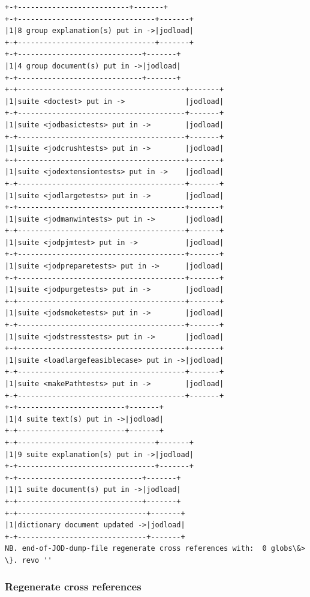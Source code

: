 \documentclass[11pt,letter,landscape]{article}
\begin{document}
\begin{Verbatim}[commandchars=\\\{\}]
+-+--------------------------+-------+
+-+--------------------------------+-------+
|1|8 group explanation(s) put in ->|jodload|
+-+--------------------------------+-------+
+-+-----------------------------+-------+
|1|4 group document(s) put in ->|jodload|
+-+-----------------------------+-------+
+-+---------------------------------------+-------+
|1|suite <doctest> put in ->              |jodload|
+-+---------------------------------------+-------+
|1|suite <jodbasictests> put in ->        |jodload|
+-+---------------------------------------+-------+
|1|suite <jodcrushtests> put in ->        |jodload|
+-+---------------------------------------+-------+
|1|suite <jodextensiontests> put in ->    |jodload|
+-+---------------------------------------+-------+
|1|suite <jodlargetests> put in ->        |jodload|
+-+---------------------------------------+-------+
|1|suite <jodmanwintests> put in ->       |jodload|
+-+---------------------------------------+-------+
|1|suite <jodpjmtest> put in ->           |jodload|
+-+---------------------------------------+-------+
|1|suite <jodpreparetests> put in ->      |jodload|
+-+---------------------------------------+-------+
|1|suite <jodpurgetests> put in ->        |jodload|
+-+---------------------------------------+-------+
|1|suite <jodsmoketests> put in ->        |jodload|
+-+---------------------------------------+-------+
|1|suite <jodstresstests> put in ->       |jodload|
+-+---------------------------------------+-------+
|1|suite <loadlargefeasiblecase> put in ->|jodload|
+-+---------------------------------------+-------+
|1|suite <makePathtests> put in ->        |jodload|
+-+---------------------------------------+-------+
+-+-------------------------+-------+
|1|4 suite text(s) put in ->|jodload|
+-+-------------------------+-------+
+-+--------------------------------+-------+
|1|9 suite explanation(s) put in ->|jodload|
+-+--------------------------------+-------+
+-+-----------------------------+-------+
|1|1 suite document(s) put in ->|jodload|
+-+-----------------------------+-------+
+-+------------------------------+-------+
|1|dictionary document updated ->|jodload|
+-+------------------------------+-------+
NB. end-of-JOD-dump-file regenerate cross references with:  0 globs\&> \}. revo '' 

    \end{Verbatim}

    \subsubsection{Regenerate cross
references}\label{regenerate-cross-references}
\end{document}
